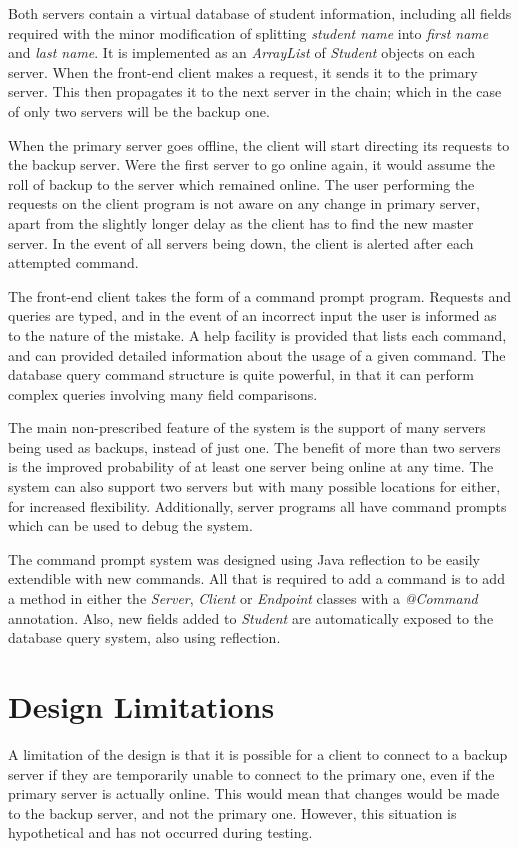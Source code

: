 \documentclass[a4paper,11pt]{article}
\begin{document}
Both servers contain a virtual database of student information, including all fields required with the minor modification of splitting \emph{student name} into \emph{first name} and \emph{last name}. It is implemented as an \emph{ArrayList} of \emph{Student} objects on each server. When the front-end client makes a request, it sends it to the primary server. This then propagates it to the next server in the chain; which in the case of only two servers will be the backup one.

When the primary server goes offline, the client will start directing its requests to the backup server. Were the first server to go online again, it would assume the roll of backup to the server which remained online. The user performing the requests on the client program is not aware on any change in primary server, apart from the slightly longer delay as the client has to find the new master server. In the event of all servers being down, the client is alerted after each attempted command.

The front-end client takes the form of a command prompt program. Requests and queries are typed, and in the event of an incorrect input the user is informed as to the nature of the mistake. A help facility is provided that lists each command, and can provided detailed information about the usage of a given command. The database query command structure is quite powerful, in that it can perform complex queries involving many field comparisons.

The main non-prescribed feature of the system is the support of many servers being used as backups, instead of just one. The benefit of more than two servers is the improved probability of at least one server being online at any time. The system can also support two servers but with many possible locations for either, for increased flexibility. Additionally, server programs all have command prompts which can be used to debug the system.

The command prompt system was designed using Java reflection to be easily extendible with new commands. All that is required to add a command is to add a method in either the \emph{Server}, \emph{Client} or \emph{Endpoint} classes with a \emph{@Command} annotation. Also, new fields added to \emph{Student} are automatically exposed to the database query system, also using reflection.

\section{Design Limitations}
A limitation of the design is that it is possible for a client to connect to a backup server if they are temporarily unable to connect to the primary one, even if the primary server is actually online. This would mean that changes would be made to the backup server, and not the primary one. However, this situation is hypothetical and has not occurred during testing.
\end{document}
